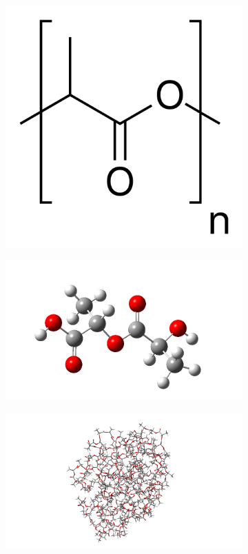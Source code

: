     \vspace{-0.5cm}
    \begin{figure}[htb]
    	\begin{subfigure}{0.3\textwidth}
    		\centering
    		\includegraphics[width=0.65\linewidth]{img/pla_vzorec.png} 
    	\end{subfigure}
    	\begin{subfigure}{0.3\textwidth}
    		\includegraphics[width=1.2\linewidth]{img/pla_1d.png}
    	\end{subfigure}
    	\begin{subfigure}{0.33\textwidth}
    		\includegraphics[width=1.4\linewidth]{img/pla_100g_tube.png}

\end{subfigure}
\end{figure}
